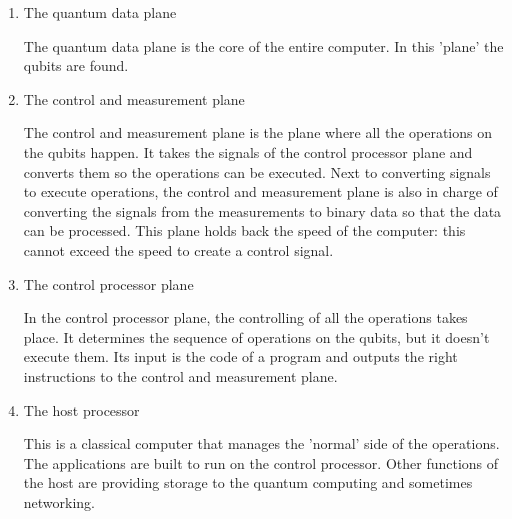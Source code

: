 \begin{enumerate}
    \item The quantum data plane

        \quad The quantum data plane is the core of the entire computer. In this 'plane' the qubits are found.

         
    \item The control and measurement plane

        \quad The control and measurement plane is the plane where all the operations on the qubits happen. It takes the signals of the control processor plane and converts them so the operations can be executed.
        Next to converting signals to execute operations, the control and measurement plane is also in charge of converting the signals from the measurements to binary data so that the data can be processed.
        This plane holds back the speed of the computer: this cannot exceed the speed to create a control signal.

    \item The control processor plane

        \quad In the control processor plane, the controlling of all the operations takes place. It determines the sequence of operations on the qubits, but it doesn't execute them. Its input is the code of a program and outputs the right instructions to the control and measurement plane.

    \item The host processor

        \quad This is a classical computer that manages the 'normal' side of the operations. The applications are built to run on the control processor. Other functions of the host are providing storage to the quantum computing and sometimes networking.

\end{enumerate}